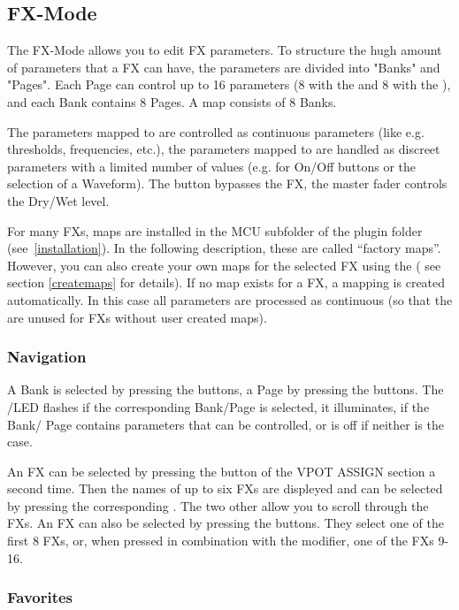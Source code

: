 \subsection{FX-Mode}\label{plugmode} 

The FX-Mode allows you to edit FX parameters. To structure the hugh
amount of parameters that a FX can have, the parameters are divided
into "Banks" and "Pages". Each Page can control up to 16 parameters (8
with the \faders and 8 with the \vpots), and each Bank contains 8
Pages. A map consists of 8 Banks.

The parameters mapped to \faders are controlled as continuous
parameters (like e.g. thresholds, frequencies, etc.), the parameters
mapped to \vpots are handled as discreet parameters with a limited
number of values (e.g.  for On/Off buttons or the selection of a
Waveform). The \flip button bypasses the FX, the master fader controls
the Dry/Wet level.


For many FXs, maps are installed in the MCU subfolder of the \reaper
plugin folder (see~\ref{installation}). In the following description,
these are called ``factory maps''. However, you can also create your
own maps for the selected FX using the \mapeditor ( see section
\ref{createmaps} for details). If no map exists for a FX, a mapping is
created automatically. In this case all parameters are processed as
continuous (so that the \vpots are unused for FXs without user created
maps).


\subsubsection{Navigation}

A Bank is selected by pressing the \solo buttons, a Page by pressing
the \mute buttons. The \solo/\mute LED flashes if the corresponding
Bank/Page is selected, it illuminates, if the Bank/ Page contains parameters
that can be controlled, or is off if neither is the case.

An FX can be selected by pressing the \plug button of the VPOT ASSIGN
section a second time. Then the names of up to six FXs are displeyed
and can be selected by pressing the corresponding \vpot. The two other
\vpots allow you to scroll through the FXs. An FX can also be selected
by pressing the \select buttons. They select one of the first 8 FXs,
or, when pressed in combination with the \shift modifier, one of the
FXs 9-16.

\subsubsection{Favorites}\label{fav}

